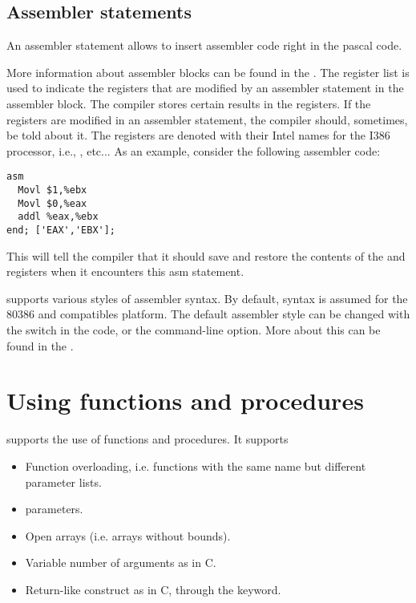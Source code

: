\section{Assembler statements}
An assembler statement allows to insert assembler code right in the
pascal code.

More information about assembler blocks can be found in the \progref.
The register list is used to indicate the registers that are modified by an
assembler statement in the assembler block. The compiler stores certain results in the
registers. If  the registers are modified in an assembler statement, the compiler
should, sometimes, be told about it. The registers are denoted with their
Intel names for the I386 processor, i.e., ,  etc...
As an example, consider the following assembler code:
\begin{verbatim}
asm
  Movl $1,%ebx
  Movl $0,%eax
  addl %eax,%ebx
end; ['EAX','EBX'];
\end{verbatim}
This will tell the compiler that it should save and restore the contents of
the  and  registers when it encounters this asm statement.

\fpc supports various styles of assembler syntax. By default, 
syntax is assumed for the 80386 and compatibles platform.
The default assembler style can be changed with the 
switch in the code, or the  command-line option. More about this can
be found in the \progref.


\chapter{Using functions and procedures}
\label{ch:Procedures}
\fpc supports the use of functions and procedures. It supports
\begin{itemize}
\item Function overloading, i.e. functions with the same name but different
parameter lists.
\item {} parameters.
\item Open arrays (i.e. arrays without bounds).
\item Variable number of arguments as in C.
\item Return-like construct as in C, through the  keyword.
\end{itemize}

